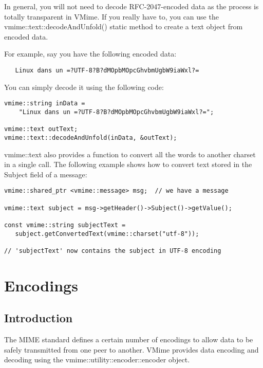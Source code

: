 In general, you will not need to decode RFC-2047-encoded data as the process
is totally transparent in VMime. If you really have to, you can use the
{\vcode vmime::text::decodeAndUnfold()} static method to create a text object
from encoded data.

For example, say you have the following encoded data:

\begin{verbatim}
   Linux dans un =?UTF-8?B?dMOpbMOpcGhvbmUgbW9iaWxl?=
\end{verbatim}

You can simply decode it using the following code:

\begin{lstlisting}[caption={Decoding RFC-2047-encoded data}]
vmime::string inData =
    "Linux dans un =?UTF-8?B?dMOpbMOpcGhvbmUgbW9iaWxl?=";

vmime::text outText;
vmime::text::decodeAndUnfold(inData, &outText);
\end{lstlisting}

{\vcode vmime::text} also provides a function to convert all the words to
another charset in a single call. The following example shows how to convert
text stored in the Subject field of a message:

\begin{lstlisting}[caption={Converting data in a {\vcode vmime::text} to a
specified charset}]
vmime::shared_ptr <vmime::message> msg;  // we have a message

vmime::text subject = msg->getHeader()->Subject()->getValue();

const vmime::string subjectText =
   subject.getConvertedText(vmime::charset("utf-8"));

// 'subjectText' now contains the subject in UTF-8 encoding
\end{lstlisting}


\section{Encodings\label{section_encodings}}

\subsection{Introduction} %

The MIME standard defines a certain number of encodings to allow data
to be safely transmitted from one peer to another. VMime provides
data encoding and decoding using the {\vcode vmime::utility::encoder::encoder} object.

